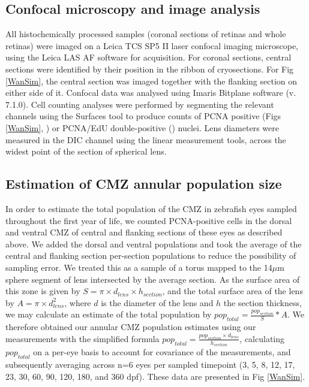 \subsection{Confocal microscopy and image analysis}
All histochemically processed samples (coronal sections of retinas and whole retinas) were imaged on a Leica TCS SP5 II laser confocal imaging microscope, using the Leica LAS AF software for acquisition. For coronal sections, central sections were identified by their position in the ribbon of cryosections. For Fig \ref{WanSim}, the central section was imaged together with the flanking section on either side of it. Confocal data was analysed using Imaris Bitplane software (v. 7.1.0). Cell counting analyses were performed by segmenting the relevant channels using the Surfaces tool to produce counts of PCNA positive (Figs \ref{WanSim}, ) or PCNA/EdU double-positive () nuclei. Lens diameters were measured in the DIC channel using the linear measurement tools, across the widest point of the section of spherical lens.

\subsection{Estimation of CMZ annular population size}
\label{sec:lenspopest}
In order to estimate the total population of the CMZ in zebrafish eyes sampled throughout the first year of life, we counted PCNA-positive cells in the dorsal and ventral CMZ of central and flanking sections of these eyes as described above. We added the dorsal and ventral populations and took the average of the central and flanking section per-section populations to reduce the possibility of sampling error. We treated this as a sample of a torus mapped to the 14$\mu$m sphere segment of lens intersected by the average section. As the surface area of this zone is given by $S = \pi \times d_{lens} \times h_{section}$, and the total surface area of the lens by $A = \pi \times d_{lens}^2$, where $d$ is the diameter of the lens and $h$ the section thickness, we may calculate an estimate of the total population by $pop_{total} = \frac{pop_{section}}{S} * A$. We therefore obtained our annular CMZ population estimates using our measurements with the simplified formula $pop_{total}=\frac{pop_{section} \times d_{lens}}{h_{section}}$, calculating $pop_{total}$ on a per-eye basis to account for covariance of the measurements, and subsequently averaging across n=6 eyes per sampled timepoint (3, 5, 8, 12, 17, 23, 30, 60, 90, 120, 180, and 360 dpf). These data are presented in Fig \ref{WanSim}.

